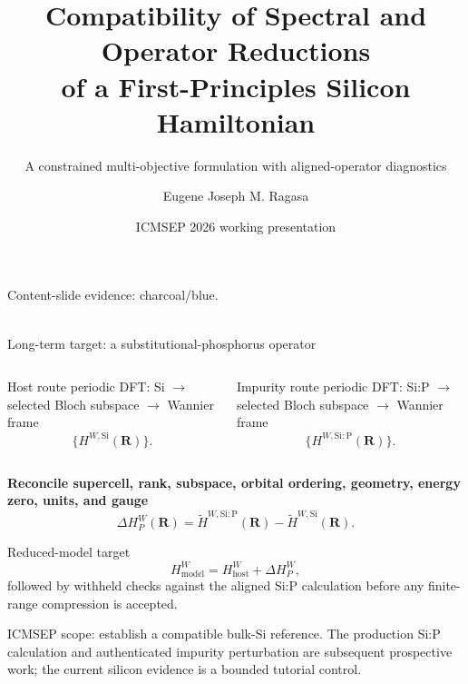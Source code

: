\documentclass[aspectratio=169,10pt]{beamer}
\title[Spectral--operator compatibility]{Compatibility of Spectral and Operator Reductions\\of a First-Principles Silicon Hamiltonian}
\subtitle{A constrained multi-objective formulation with aligned-operator diagnostics}
\author{Eugene Joseph M. Ragasa}
\institute{Department of Physics\\De La Salle University, Manila, Philippines}
\date{ICMSEP 2026 working presentation}
\newcommand{\future}[1]{\textcolor{prospectivered}{#1}}
\begin{document}
{
\begin{frame}[plain]
  \titlepage
  \vspace{-0.9em}
  \begin{center}
    \scriptsize\color{white!84}
    Content-slide evidence: charcoal/blue.\qquad
    \textcolor{white}{Red: prospective work or an unexecuted extension.}
  \end{center}
\end{frame}
}

\begin{frame}{Long-term target: a substitutional-phosphorus operator}
  \small
  \begin{columns}[T]
      \begin{block}{Host route}
        \centering
        periodic DFT: Si
        $\longrightarrow$
        selected Bloch subspace
        $\longrightarrow$
        Wannier frame
        \[
          \{H^{W,\mathrm{Si}}(\mathbf R)\}.
        \]
      \end{block}
      \begin{block}{Impurity route}
        \centering
        periodic DFT: Si:P
        $\longrightarrow$
        selected Bloch subspace
        $\longrightarrow$
        Wannier frame
        \[
          \{H^{W,\mathrm{Si:P}}(\mathbf R)\}.
        \]
      \end{block}
  \end{columns}

  \begin{center}
    \textbf{Reconcile supercell, rank, subspace, orbital ordering, geometry,
    energy zero, units, and gauge}
    \[
      \Delta H_P^W(\mathbf R)
      =\widetilde H^{W,\mathrm{Si:P}}(\mathbf R)
       -\widetilde H^{W,\mathrm{Si}}(\mathbf R).
    \]
  \end{center}

  \begin{block}{Reduced-model target}
    \[
      H_{\mathrm{model}}^W
      =H_{\mathrm{host}}^W+\Delta H_P^W,
    \]
    followed by withheld checks against the aligned Si:P calculation before any
    finite-range compression is accepted.
  \end{block}

  \centering
  \future{ICMSEP scope: establish a compatible bulk-Si reference. The production Si:P
  calculation and authenticated impurity perturbation are subsequent prospective work;
  the current silicon evidence is a bounded tutorial control.}
\end{frame}
\end{document}
